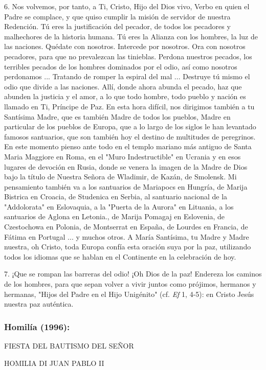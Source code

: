\begin{body}
6. Nos volvemos, por tanto, a Ti, Cristo, Hijo del Dios vivo, Verbo en quien el Padre se complace, y que quiso cumplir la misión de servidor de nuestra Redención. Tú eres la justificación del pecador, de todos los pecadores y malhechores de la historia humana. Tú eres la Alianza con los hombres, la luz de las naciones. Quédate con nosotros. Intercede por nosotros. Ora con nosotros pecadores, para que no prevalezcan las tinieblas. Perdona nuestros pecados, los terribles pecados de los hombres dominados por el odio, así como nosotros perdonamos ... Tratando de romper la espiral del mal ... Destruye tú mismo el odio que divide a las naciones. Allí, donde ahora abunda el pecado, haz que abunden la justicia y el amor, a lo que todo hombre, todo pueblo y nación es llamado en Ti, Príncipe de Paz. En esta hora difícil, nos dirigimos también a tu Santísima Madre, que es también Madre de todos los pueblos, Madre en particular de los pueblos de Europa, que a lo largo de los siglos le han levantado famosos santuarios, que son también hoy el destino de multitudes de peregrinos. En este momento pienso ante todo en el templo mariano más antiguo de Santa Maria Maggiore en Roma, en el "Muro Indestructible" en Ucrania y en esos lugares de devoción en Rusia, donde se venera la imagen de la Madre de Dios bajo la título de Nuestra Señora de Wladimir, de Kazán, de Smolensk. Mi pensamiento también va a los santuarios de Mariapocs en Hungría, de Marija Bistrica en Croacia, de Studenica en Serbia, al santuario nacional de la "Addolorata" en Eslovaquia, a la "Puerta de la Aurora" en Lituania, a los santuarios de Aglona en Letonia., de Marija Pomagaj en Eslovenia, de Czestochowa en Polonia, de Montserrat en España, de Lourdes en Francia, de Fátima en Portugal ... y muchos otros. A María Santísima, tu Madre y Madre nuestra, oh Cristo, toda Europa confía esta oración suya por la paz, utilizando todos los idiomas que se hablan en el Continente en la celebración de hoy.

7. ¡Que se rompan las barreras del odio! ¡Oh Dios de la paz! Endereza los caminos de los hombres, para que sepan volver a vivir juntos como prójimos, hermanos y hermanas, "Hijos del Padre en el Hijo Unigénito" (cf. \emph{Ef} 1, 4-5): en Cristo Jesús nuestra paz auténtica.

\subsubsection{Homilía (1996): } FIESTA DEL BAUTISMO DEL SEÑOR

HOMILIA DI JUAN PABLO II


\end{body}
